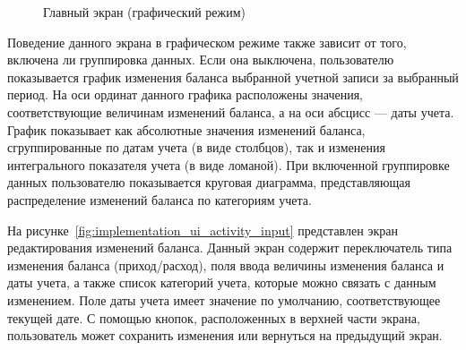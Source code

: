 \begin{figure}[h!]
  \centering
  \caption{Главный экран (графический режим)}
  \label{fig:implementation_ui_activity_balance_graphic}
\end{figure}

Поведение данного экрана в графическом режиме также зависит от того,
включена ли группировка данных. Если она выключена,
пользователю показывается график изменения баланса выбранной
учетной записи за выбранный период.
На оси ординат данного графика расположены значения,
соответствующие величинам изменений баланса,
а на оси абсцисс --- даты учета.
График показывает как абсолютные значения изменений баланса,
сгруппированные по датам учета (в виде столбцов),
так и изменения интегрального показателя учета (в виде ломаной).
При включенной группировке данных пользователю показывается
круговая диаграмма, представляющая распределение изменений баланса
по категориям учета.

На рисунке~\ref{fig:implementation_ui_activity_input}
представлен экран редактирования изменений баланса.
Данный экран содержит переключатель типа изменения баланса (приход/расход),
поля ввода величины изменения баланса и даты учета, а также список
категорий учета, которые можно связать с данным изменением.
Поле даты учета имеет значение по умолчанию, соответствующее текущей дате.
С помощью кнопок, расположенных в верхней части экрана, пользователь
может сохранить изменения или вернуться на предыдущий экран.

